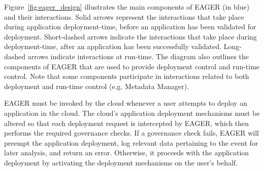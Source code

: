 
Figure~\ref{fig:eager_design} illustrates the main components of EAGER (in
blue) and their interactions. Solid arrows represent the interactions that take place
during application deployment-time, before an application has been validated
for deployment. Short-dashed arrows indicate the interactions that take place
during deployment-time, after an application has been successfully validated.
Long-dashed arrows indicate interactions at run-time. The diagram also outlines the
components of EAGER that are used to provide deployment  control and run-time control.
Note that some components participate in interactions related to both deployment and
run-time control (e.g. Metadata Manager).

EAGER must be invoked by the cloud whenever a user
attempts to deploy an application in the cloud.
The cloud's application deployment mechanisms must be altered so that
each deployment request is
intercepted by EAGER, which then performs the required governance checks.
If a governance check fails, EAGER will preempt the application deployment,
log relevant data pertaining to the event for later analysis,  and
return an error. Otherwise, it proceeds with the application deployment by
activating the deployment mechanisms on the user's 
behalf. 

